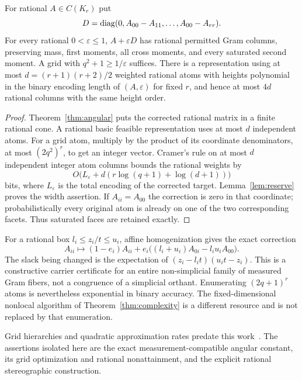 \begin{corollary}\label{cor:moments}
For rational $A\in C(K_r)$ put
\[
 D=\operatorname{diag}(0,A_{00}-A_{11},\ldots,A_{00}-A_{rr}).
\]
For every rational $0<\varepsilon\le1$, $A+\varepsilon D$ has rational permitted Gram columns, preserving mass, first moments, all cross moments, and every saturated second moment. A grid with $q^2+1\ge1/\varepsilon$ suffices. There is a representation using at most $d=(r+1)(r+2)/2$ weighted rational atoms with heights polynomial in the binary encoding length of $(A,\varepsilon)$ for fixed $r$, and hence at most $4d$ rational columns with the same height order.
\end{corollary}
\begin{proof}
Theorem~\ref{thm:angular} puts the corrected rational matrix in a finite rational cone. A rational basic feasible representation uses at most $d$ independent atoms. For a grid atom, multiply by the product of its coordinate denominators, at most $(2q^2)^r$, to get an integer vector. Cramer's rule on at most $d$ independent integer atom columns bounds the rational weights by
\[
 O\bigl(L_\varepsilon+d(r\log(q+1)+\log(d+1))\bigr)
\]
bits, where $L_\varepsilon$ is the total encoding of the corrected target. Lemma~\ref{lem:reserve} proves the width assertion. If $A_{ii}=A_{00}$ the correction is zero in that coordinate; probabilistically every original atom is already on one of the two corresponding facets. Thus saturated faces are retained exactly.
\end{proof}

For a rational box $l_i\le z_i/t\le u_i$, affine homogenization gives the exact correction
\[
 A_{ii}\longmapsto(1-e_i)A_{ii}+e_i\bigl((l_i+u_i)A_{0i}-l_iu_iA_{00}\bigr).
\]
The slack being changed is the expectation of $(z_i-l_it)(u_it-z_i)$. This is a constructive carrier certificate for an entire non-simplicial family of measured Gram fibers, not a congruence of a simplicial orthant. Enumerating $(2q+1)^r$ atoms is nevertheless exponential in binary accuracy. The fixed-dimensional nonlocal algorithm of Theorem~\ref{thm:complexity} is a different resource and is not replaced by that enumeration.

Grid hierarchies and quadratic approximation rates predate this work~\cite{Yildirim,DKLSV}. The assertions isolated here are the exact measurement-compatible angular constant, its grid optimization and rational nonattainment, and the explicit rational stereographic construction.

